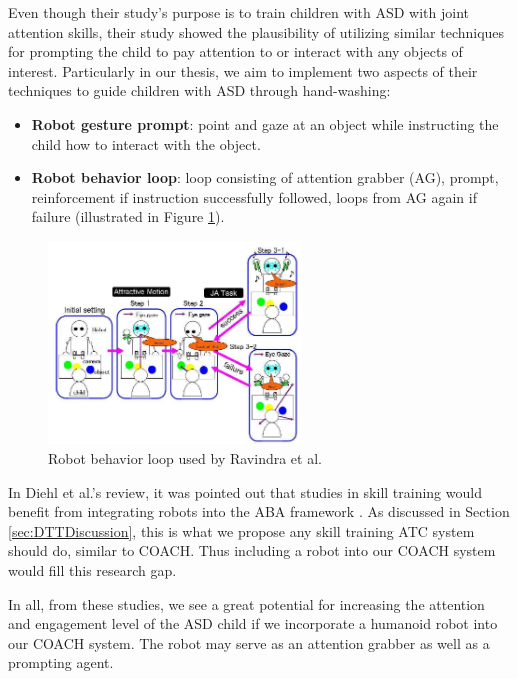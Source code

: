 \documentclass{ut-thesis}
\begin{document}
Even though their study's purpose is to train children with ASD with joint attention skills, their study showed the plausibility of utilizing similar techniques for prompting the child to pay attention to or interact with any objects of interest.  Particularly in our thesis, we aim to implement two aspects of their techniques to guide children with ASD through hand-washing:
\begin{itemize}
	\item \textbf{Robot gesture prompt}: point and gaze at an object while instructing the child how to interact with the object.
	\item \textbf{Robot behavior loop}: loop consisting of attention grabber (AG), prompt, reinforcement if instruction successfully followed, loops from AG again if failure (illustrated in Figure \ref{fig:ravindra2009therapeutic}).
\end{itemize}
\begin{figure} [h]
	\centering
	\includegraphics[width=0.6\textwidth]{./img/ravindra2009therapeutic.png}
	\caption{Robot behavior loop used by Ravindra et al. \cite{ravindra2009therapeutic}}
	\label{fig:ravindra2009therapeutic}
\end{figure}

In Diehl et al.'s review, it was pointed out that studies in skill training would benefit from integrating robots into the ABA framework \cite{diehl2012clinical}.  As discussed in Section \ref{sec:DTTDiscussion}, this is what we propose any skill training ATC system should do, similar to COACH.  Thus including a robot into our COACH system would fill this research gap.


In all, from these studies, we see a great potential for increasing the attention and engagement level of the ASD child if we incorporate a humanoid robot into our COACH system.  The robot may serve as an attention grabber as well as a prompting agent.
\end{document}
